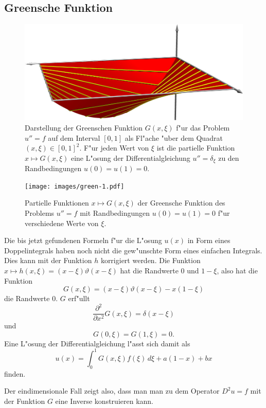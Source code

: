 \subsection{Greensche Funktion}
\begin{figure}
\begin{center}
\includegraphics[width=\hsize]{3d/green.jpg}
\end{center}
\caption{Darstellung der Greenschen Funktion $G(x,\xi)$
f"ur das Problem $u''=f$ auf
dem Interval $[0,1]$ als Fl"ache "uber dem Quadrat $(x,\xi)\in[0,1]^2$.
F"ur jeden Wert von $\xi$ ist die partielle Funktion $x\mapsto G(x,\xi)$
eine L"osung der Differentialgleichung $u''=\delta_\xi$ zu den Randbedingungen
$u(0)=u(1)=0$.
\label{elliptisch:green3dflaeche}}
\end{figure}
\begin{figure}
\begin{center}
\texttt{[image: images/green-1.pdf]}
\end{center}
\caption{Partielle Funktionen $x\mapsto G(x,\xi)$ der Greensche Funktion
des Problems $u''=f$ mit Randbedingungen $u(0)=u(1)=0$ f"ur
verschiedene Werte von $\xi$.
\label{elliptisch:green1schar}}
\end{figure}

Die bis jetzt gefundenen Formeln f"ur die L"osung $u(x)$
in Form eines Doppelintegrals haben noch
nicht die gew"unschte Form eines einfachen Integrals.
Dies kann mit der Funktion $h$ korrigiert werden.
Die Funktion $x\mapsto h(x,\xi)=(x-\xi)\vartheta(x-\xi)$ hat die Randwerte
$0$ und $1-\xi$, also hat die Funktion
\[
G(x,\xi)=(x-\xi)\vartheta(x-\xi)-x(1-\xi)
\]
die Randwerte $0$.
$G$ erf"ullt
\[
\frac{\partial^2}{\partial x^2}G(x,\xi)=\delta(x-\xi)
\]
und
\[
G(0,\xi)=G(1,\xi)=0.
\]
Eine L"osung der Differentialgleichung l"asst sich damit
als 
\[
u(x)=\int_0^1G(x,\xi)f(\xi)\,d\xi+a(1-x)+bx
\]
finden.

Der eindimensionale Fall zeigt also, dass man man zu dem Operator $D^2u=f$
mit der Funktion $G$ eine Inverse konstruieren kann.

